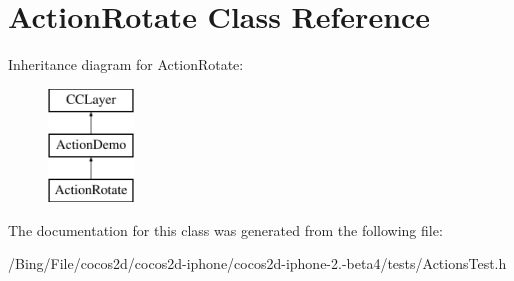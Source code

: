 \hypertarget{interface_action_rotate}{\section{Action\-Rotate Class Reference}
\label{interface_action_rotate}
}
Inheritance diagram for Action\-Rotate\-:\begin{figure}[H]
\begin{center}
\leavevmode
\includegraphics[height=3.000000cm]{interface_action_rotate}
\end{center}
\end{figure}


The documentation for this class was generated from the following file\-:\begin{DoxyCompactItemize}
\item 
/\-Bing/\-File/cocos2d/cocos2d-\/iphone/cocos2d-\/iphone-\/2.-\/beta4/tests/Actions\-Test.\-h\end{DoxyCompactItemize}

